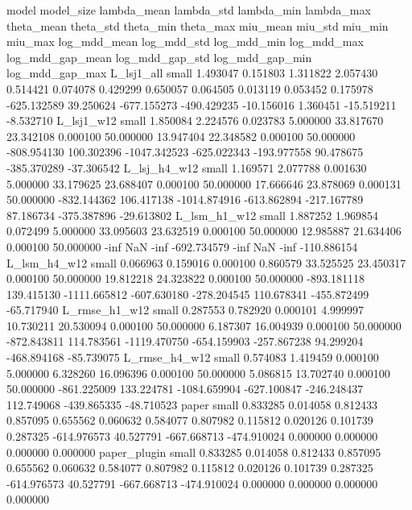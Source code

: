         model model_size  lambda_mean  lambda_std  lambda_min  lambda_max  theta_mean  theta_std  theta_min  theta_max  miu_mean   miu_std  miu_min   miu_max  log_mdd_mean  log_mdd_std  log_mdd_min  log_mdd_max  log_mdd_gap_mean  log_mdd_gap_std  log_mdd_gap_min  log_mdd_gap_max
   L_lsj1_all      small     1.493047    0.151803    1.311822    2.057430    0.514421   0.074078   0.429299   0.650057  0.064505  0.013119 0.053452  0.175978   -625.132589    39.250624  -677.155273  -490.429235        -10.156016         1.360451       -15.519211        -8.532710
   L_lsj1_w12      small     1.850084    2.224576    0.023783    5.000000   33.817670  23.342108   0.000100  50.000000 13.947404 22.348582 0.000100 50.000000   -808.954130   100.302396 -1047.342523  -625.022343       -193.977558        90.478675      -385.370289       -37.306542
 L_lsj_h4_w12      small     1.169571    2.077788    0.001630    5.000000   33.179625  23.688407   0.000100  50.000000 17.666646 23.878069 0.000131 50.000000   -832.144362   106.417138 -1014.874916  -613.862894       -217.167789        87.186734      -375.387896       -29.613802
 L_lsm_h1_w12      small     1.887252    1.969854    0.072499    5.000000   33.095603  23.632519   0.000100  50.000000 12.985887 21.634406 0.000100 50.000000          -inf          NaN         -inf  -692.734579              -inf              NaN             -inf      -110.886154
 L_lsm_h4_w12      small     0.066963    0.159016    0.000100    0.860579   33.525525  23.450317   0.000100  50.000000 19.812218 24.323822 0.000100 50.000000   -893.181118   139.415130 -1111.665812  -607.630180       -278.204545       110.678341      -455.872499       -65.717940
L_rmse_h1_w12      small     0.287553    0.782920    0.000101    4.999997   10.730211  20.530094   0.000100  50.000000  6.187307 16.004939 0.000100 50.000000   -872.843811   114.783561 -1119.470750  -654.159903       -257.867238        94.299204      -468.894168       -85.739075
L_rmse_h4_w12      small     0.574083    1.419459    0.000100    5.000000    6.328260  16.096396   0.000100  50.000000  5.086815 13.702740 0.000100 50.000000   -861.225009   133.224781 -1084.659904  -627.100847       -246.248437       112.749068      -439.865335       -48.710523
        paper      small     0.833285    0.014058    0.812433    0.857095    0.655562   0.060632   0.584077   0.807982  0.115812  0.020126 0.101739  0.287325   -614.976573    40.527791  -667.668713  -474.910024          0.000000         0.000000         0.000000         0.000000
 paper_plugin      small     0.833285    0.014058    0.812433    0.857095    0.655562   0.060632   0.584077   0.807982  0.115812  0.020126 0.101739  0.287325   -614.976573    40.527791  -667.668713  -474.910024          0.000000         0.000000         0.000000         0.000000